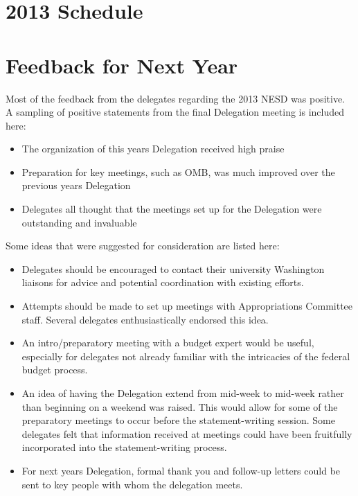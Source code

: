 \documentclass[12pt]{article}
\begin{document}
\begin{doublespace}
\section{2013 Schedule}


\newpage
\section{Feedback for Next Year}

Most of the feedback from the delegates regarding the 2013 NESD was positive.  A
sampling of positive statements from the final Delegation meeting is included
here:

\begin{itemize}
\item The organization of this years Delegation received high praise
\item Preparation for key meetings, such as OMB, was much improved over the
  previous years Delegation
\item Delegates all thought that the meetings set up for the Delegation were
  outstanding and invaluable
\end{itemize}

Some ideas that were suggested for consideration are listed here:
\begin{itemize}
\item Delegates should be encouraged to contact their university Washington
  liaisons for advice and potential coordination with existing efforts.
\item Attempts should be made to set up meetings with Appropriations Committee
  staff.  Several delegates enthusiastically endorsed this idea.
\item An intro/preparatory meeting with a budget expert would be useful,
  especially for delegates not already familiar with the intricacies of the
  federal budget process.
\item An idea of having the Delegation extend from mid-week to mid-week rather
  than beginning on a weekend was raised.  This would allow for some of the
  preparatory meetings to occur before the statement-writing session.  Some
  delegates felt that information received at meetings could have been
  fruitfully incorporated into the statement-writing process.
\item For next years Delegation, formal thank you and follow-up letters could be
  sent to key people with whom the delegation meets.
\end{itemize}


\end{doublespace}
\end{document}
